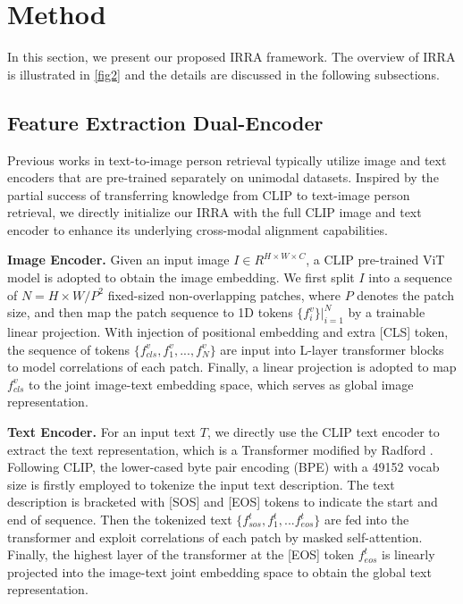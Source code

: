 \documentclass[10pt,twocolumn,letterpaper]{article}
\begin{document}
\section{Method}
In this section, we present our proposed IRRA framework. The overview of IRRA is illustrated in \cref{fig2} and the details are discussed in the following subsections.

\subsection{Feature Extraction Dual-Encoder}
\label{subsec:feature}
Previous works in text-to-image person retrieval typically utilize image and text encoders that are pre-trained separately on unimodal datasets.
Inspired by the partial success of transferring knowledge from CLIP to text-image person retrieval\cite{han2021text}, we directly initialize our IRRA with the full CLIP image and text encoder to enhance its underlying cross-modal alignment capabilities.

\textbf{Image Encoder.} Given an input image $I \in R^{H\times W \times C}$, a CLIP pre-trained ViT model is adopted to obtain the image embedding. We first split $I$ into a sequence of $N = H\times W / P^2$ fixed-sized non-overlapping patches, where $P$ denotes the patch size, and then map the patch sequence to 1D tokens $ \{f_i^v\}|_{i=1}^{N} $ by a trainable linear projection. With injection of positional embedding and extra [CLS] token, the sequence of tokens $ \{f_{cls}^v, f_1^v, ..., f_N^v\} $ are input into L-layer transformer blocks to model correlations of each patch. Finally, a linear projection is adopted to map $ f_{cls}^v$ to the joint image-text embedding space, which serves as global image representation.

\textbf{Text Encoder.} For an input text $ T $, we directly use the CLIP text encoder to extract the text representation, which is a Transformer\cite{vaswani2017attention} modified by Radford \etal \cite{radford2021learning}. Following CLIP, the lower-cased byte pair encoding (BPE) with a 49152 vocab size\cite{sennrich2015neural} is firstly employed to tokenize the input text description. The text description is bracketed with [SOS] and [EOS] tokens to indicate the start and end of sequence. Then the tokenized text $ \{f_{sos}^t, f_1^t, ... f_{eos}^t\} $ are fed into the transformer and exploit correlations of each patch by masked self-attention. Finally, the highest layer of the transformer at the [EOS] token $f_{eos}^t$ is linearly projected into the image-text joint embedding space to obtain the global text representation.
\end{document}
